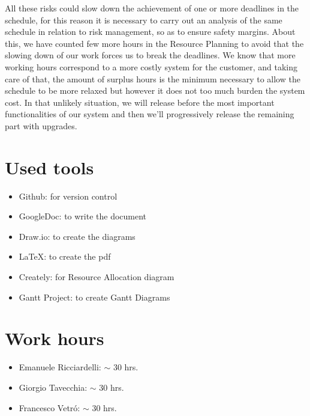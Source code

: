 \documentclass[10pt, a4paper,titlepage]{article}
\begin{document}
All these risks could slow down the achievement of one or more deadlines in the schedule, for this reason it is necessary to carry out an analysis of the same schedule in relation to risk management, so as to ensure safety margins. About this, we have counted few more hours in the Resource Planning to avoid that the slowing down of our work forces us to break the deadlines. We know that more working hours correspond to a more costly system for the customer, and taking care of that, the amount of surplus hours is the minimum necessary to allow the schedule to be more relaxed but however it does not too much burden the system cost. In that unlikely situation, we will release before the most important functionalities of our system and then we’ll progressively release the remaining part with upgrades.
\section*{Used tools}
\begin{itemize}
\item Github: for version control
\item GoogleDoc: to write the document
\item Draw.io: to create the diagrams
\item \LaTeX: to create the pdf
\item Creately: for Resource Allocation diagram
\item Gantt Project: to create Gantt Diagrams
\end{itemize}
\section*{Work hours} 
\begin{itemize}
\item Emanuele Ricciardelli: $\sim$ 30 hrs.
\item Giorgio Tavecchia: $\sim$ 30 hrs.
\item Francesco Vetr\'o: $\sim$ 30 hrs.
\end{itemize}
\end{document}
